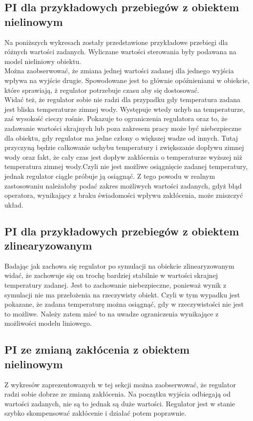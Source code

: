 \subsection{PI dla przykładowych przebiegów z obiektem nielinowym}
\indent Na poniższych wykresach zostały przedstawione przykładowe przebiegi dla różnych wartości zadanych. Wyliczane wartości sterowania były podawana na model nieliniowy obiektu. \\
\indent Można zaobserwować, że zmiana jednej wartości zadanej dla jednego wyjścia wpływa na wyjście drugie. Spowodowane jest to głównie opóźnieniami w obiekcie, które sprawiają, ż regulator potrzebuje czasu aby się dostosować. \\
\indent Widać też, że regulator sobie nie radzi dla przypadku gdy temperatura zadana jest bliska temperaturze zimnej wody. Występuje wtedy uchyb na temperaturze, zaś wysokość cieczy rośnie. Pokazuje to ograniczenia regulatora oraz to, że zadawanie wartości skrajnych lub poza zakresem pracy może być niebezpieczne dla obiektu, gdy regulator ma jedne człony o większej wadze od innych. Tutaj przyczyną będzie całkowanie uchybu temperatury i zwiększanie dopływu zimnej wody oraz fakt, że cały czas jest dopływ zakłócenia o temperaturze wyższej niż temperatura zimnej wody.Czyli nie jest możliwe osiągnięcie zadanej temperatury, jednak regulator ciągle próbuje ją osiągnąć. Z tego powodu w realnym zastosowaniu należałoby podać zakres możliwych wartości zadanych, gdyż błąd operatora, wynikający z braku świadomości wpływu zakłócenia, może zniszczyć układ. 

\FloatBarrier
    
\FloatBarrier


\subsection{PI dla przykładowych przebiegów z obiektem zlinearyzowanym}
\indent Badając jak zachowa się regulator po symulacji na obiekcie zlinearyzowanym widać, że zachowuje się on trochę bardziej stabilnie w wartości skrajnej temperatury zadanej. Jest to zachowanie niebezpieczne, ponieważ wynik z symulacji nie ma przełożenia na rzeczywisty obiekt. Czyli w tym wypadku jest pokazane, że zadana temperaturę można osiągnąć, gdy w rzeczywistości nie jest to możliwe. Należy zatem mieć to na uwadze ograniczenia wynikające z możliwości modelu liniowego.
\FloatBarrier
    
\FloatBarrier

\subsection{PI ze zmianą zakłócenia z obiektem nielinowym}
\indent Z wykresów zaprezentowanych w tej sekcji można zaobserwować, że regulator radzi sobie dobrze ze zmianą zakłócenia. Na początku wyjścia odbiegają od wartości zadanych, nie są to jednak są duże wartości. Regulator jest w stanie szybko skompensować zakłócenie i działać potem poprawnie.
\FloatBarrier
    
\FloatBarrier


